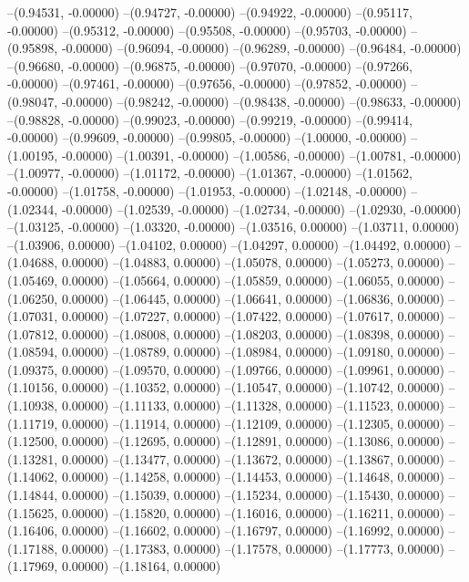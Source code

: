 --(0.94531, -0.00000)
--(0.94727, -0.00000)
--(0.94922, -0.00000)
--(0.95117, -0.00000)
--(0.95312, -0.00000)
--(0.95508, -0.00000)
--(0.95703, -0.00000)
--(0.95898, -0.00000)
--(0.96094, -0.00000)
--(0.96289, -0.00000)
--(0.96484, -0.00000)
--(0.96680, -0.00000)
--(0.96875, -0.00000)
--(0.97070, -0.00000)
--(0.97266, -0.00000)
--(0.97461, -0.00000)
--(0.97656, -0.00000)
--(0.97852, -0.00000)
--(0.98047, -0.00000)
--(0.98242, -0.00000)
--(0.98438, -0.00000)
--(0.98633, -0.00000)
--(0.98828, -0.00000)
--(0.99023, -0.00000)
--(0.99219, -0.00000)
--(0.99414, -0.00000)
--(0.99609, -0.00000)
--(0.99805, -0.00000)
--(1.00000, -0.00000)
--(1.00195, -0.00000)
--(1.00391, -0.00000)
--(1.00586, -0.00000)
--(1.00781, -0.00000)
--(1.00977, -0.00000)
--(1.01172, -0.00000)
--(1.01367, -0.00000)
--(1.01562, -0.00000)
--(1.01758, -0.00000)
--(1.01953, -0.00000)
--(1.02148, -0.00000)
--(1.02344, -0.00000)
--(1.02539, -0.00000)
--(1.02734, -0.00000)
--(1.02930, -0.00000)
--(1.03125, -0.00000)
--(1.03320, -0.00000)
--(1.03516, 0.00000)
--(1.03711, 0.00000)
--(1.03906, 0.00000)
--(1.04102, 0.00000)
--(1.04297, 0.00000)
--(1.04492, 0.00000)
--(1.04688, 0.00000)
--(1.04883, 0.00000)
--(1.05078, 0.00000)
--(1.05273, 0.00000)
--(1.05469, 0.00000)
--(1.05664, 0.00000)
--(1.05859, 0.00000)
--(1.06055, 0.00000)
--(1.06250, 0.00000)
--(1.06445, 0.00000)
--(1.06641, 0.00000)
--(1.06836, 0.00000)
--(1.07031, 0.00000)
--(1.07227, 0.00000)
--(1.07422, 0.00000)
--(1.07617, 0.00000)
--(1.07812, 0.00000)
--(1.08008, 0.00000)
--(1.08203, 0.00000)
--(1.08398, 0.00000)
--(1.08594, 0.00000)
--(1.08789, 0.00000)
--(1.08984, 0.00000)
--(1.09180, 0.00000)
--(1.09375, 0.00000)
--(1.09570, 0.00000)
--(1.09766, 0.00000)
--(1.09961, 0.00000)
--(1.10156, 0.00000)
--(1.10352, 0.00000)
--(1.10547, 0.00000)
--(1.10742, 0.00000)
--(1.10938, 0.00000)
--(1.11133, 0.00000)
--(1.11328, 0.00000)
--(1.11523, 0.00000)
--(1.11719, 0.00000)
--(1.11914, 0.00000)
--(1.12109, 0.00000)
--(1.12305, 0.00000)
--(1.12500, 0.00000)
--(1.12695, 0.00000)
--(1.12891, 0.00000)
--(1.13086, 0.00000)
--(1.13281, 0.00000)
--(1.13477, 0.00000)
--(1.13672, 0.00000)
--(1.13867, 0.00000)
--(1.14062, 0.00000)
--(1.14258, 0.00000)
--(1.14453, 0.00000)
--(1.14648, 0.00000)
--(1.14844, 0.00000)
--(1.15039, 0.00000)
--(1.15234, 0.00000)
--(1.15430, 0.00000)
--(1.15625, 0.00000)
--(1.15820, 0.00000)
--(1.16016, 0.00000)
--(1.16211, 0.00000)
--(1.16406, 0.00000)
--(1.16602, 0.00000)
--(1.16797, 0.00000)
--(1.16992, 0.00000)
--(1.17188, 0.00000)
--(1.17383, 0.00000)
--(1.17578, 0.00000)
--(1.17773, 0.00000)
--(1.17969, 0.00000)
--(1.18164, 0.00000)
